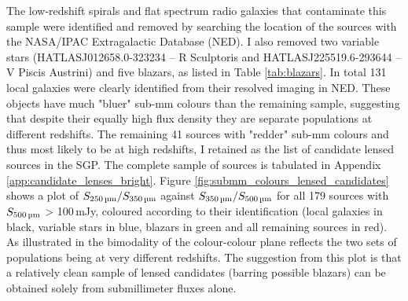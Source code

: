 The low-redshift spirals and flat spectrum radio galaxies that contaminate this sample were identified and removed by searching the location of the sources with the NASA/IPAC Extragalactic Database (NED). I also removed two variable stars (HATLASJ012658.0-323234 -- R Sculptoris and HATLASJ225519.6-293644 -- V Piscis Austrini) and five blazars, as listed in Table \ref{tab:blazars}. In total 131 local galaxies were clearly identified from their resolved imaging in NED. These objects have much "bluer" sub-mm colours than the remaining sample, suggesting that despite their equally high flux density they are separate populations at different redshifts. The remaining 41 sources with "redder" sub-mm colours and thus most likely to be at high redshifts, I retained as the list of candidate lensed sources in the SGP. The complete sample of sources is tabulated in Appendix \ref{app:candidate_lenses_bright}. Figure \ref{fig:submm_colours_lensed_candidates} shows a plot of $S_{\textrm{250\,\micron}}/S_{\textrm{350\,\micron}}$ against $S_{\textrm{350\,\micron}}/S_{\textrm{500\,\micron}}$ for all 179 sources with $S_{\textrm{500\,\micron}}$ > 100\,mJy, coloured according to their identification (local galaxies in black, variable stars in blue, blazars in green and all remaining sources in red). As illustrated in \citealt{Negrello_2017} the bimodality of the colour-colour plane reflects the two sets of populations being at very different redshifts. The suggestion from this plot is that a relatively clean sample of lensed candidates (barring possible blazars) can be obtained solely from submillimeter fluxes alone.

